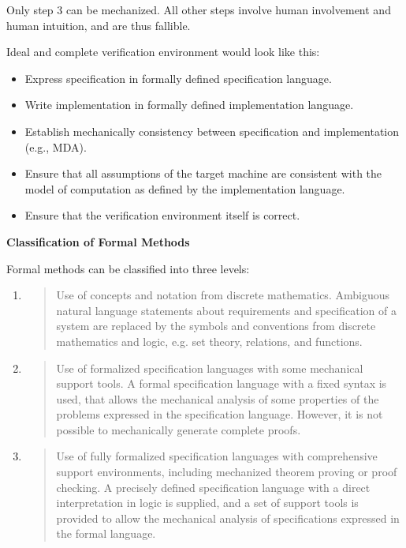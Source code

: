 Only step 3 can be mechanized. All other steps involve human involvement
and human intuition, and are thus fallible.

Ideal and complete verification environment would look like this:

\begin{itemize}
\item
  Express specification in formally defined specification language.
\item
  Write implementation in formally defined implementation language.
\item
  Establish mechanically consistency between specification and
  implementation (e.g., MDA).
\item
  Ensure that all assumptions of the target machine are consistent with
  the model of computation as defined by the implementation language.
\item
  Ensure that the verification environment itself is correct.
\end{itemize}

\textbf{Classification of Formal Methods}

Formal methods can be classified into three levels:

\begin{enumerate}
\def\labelenumi{\arabic{enumi}.}
\item
  \begin{quote}
  Use of concepts and notation from discrete mathematics. Ambiguous
  natural language statements about requirements and specification of a
  system are replaced by the symbols and conventions from discrete
  mathematics and logic, e.g. set theory, relations, and functions.
  \end{quote}
\item
  \begin{quote}
  Use of formalized specification languages with some mechanical support
  tools. A formal specification language with a fixed syntax is used,
  that allows the mechanical analysis of some properties of the problems
  expressed in the specification language. However, it is not possible
  to mechanically generate complete proofs.
  \end{quote}
\item
  \begin{quote}
  Use of fully formalized specification languages with comprehensive
  support environments, including mechanized theorem proving or proof
  checking. A precisely defined specification language with a direct
  interpretation in logic is supplied, and a set of support tools is
  provided to allow the mechanical analysis of specifications expressed
  in the formal language.
  \end{quote}
\end{enumerate}

